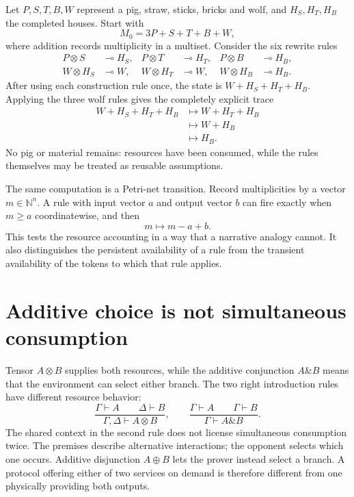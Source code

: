 Let \(P,S,T,B,W\) represent a pig, straw, sticks, bricks and wolf, and \(H_S,H_T,H_B\) the completed houses. Start with
\[
 M_0=3P+S+T+B+W,
\]
where addition records multiplicity in a multiset. Consider the six rewrite rules
\[
\begin{aligned}
 P\otimes S&\multimap H_S,&
 P\otimes T&\multimap H_T,&
 P\otimes B&\multimap H_B,\\
 W\otimes H_S&\multimap W,&
 W\otimes H_T&\multimap W,&
 W\otimes H_B&\multimap H_B.
\end{aligned}
\]
After using each construction rule once, the state is \(W+H_S+H_T+H_B\). Applying the three wolf rules gives the completely explicit trace
\[
\begin{aligned}
 W+H_S+H_T+H_B
 &\longmapsto W+H_T+H_B\\
 &\longmapsto W+H_B\\
 &\longmapsto H_B.
\end{aligned}
\]
No pig or material remains: resources have been consumed, while the rules themselves may be treated as reusable assumptions.

The same computation is a Petri-net transition. Record multiplicities by a vector \(m\in\mathbb N^n\). A rule with input vector \(a\) and output vector \(b\) can fire exactly when \(m\ge a\) coordinatewise, and then
\[
 \boxed{m\longmapsto m-a+b.}
\]
This tests the resource accounting in a way that a narrative analogy cannot. It also distinguishes the persistent availability of a rule from the transient availability of the tokens to which that rule applies.

\section{Additive choice is not simultaneous consumption}

Tensor \(A\otimes B\) supplies both resources, while the additive conjunction \(A\mathbin{\&}B\) means that the environment can select either branch. The two right introduction rules have different resource behavior:
\[
 \frac{\Gamma\vdash A\qquad\Delta\vdash B}
      {\Gamma,\Delta\vdash A\otimes B},
 \qquad
 \frac{\Gamma\vdash A\qquad\Gamma\vdash B}
      {\Gamma\vdash A\mathbin{\&}B}.
\]
The shared context in the second rule does not license simultaneous consumption twice. The premises describe alternative interactions; the opponent selects which one occurs. Additive disjunction \(A\oplus B\) lets the prover instead select a branch. A protocol offering either of two services on demand is therefore different from one physically providing both outputs.

